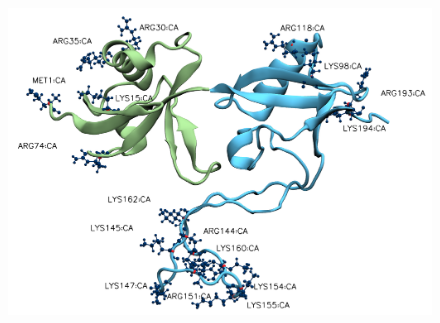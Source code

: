 \documentclass[
  twocolumn]{biophys-new-mod}
\begin{document}
\begin{figure}

\begin{minipage}[t]{\linewidth}

{\centering 


}

\subcaption{\label{fig-f0f1-ri-npip}~}
\end{minipage}%
\newline
\begin{minipage}[t]{\linewidth}

{\centering 

\includegraphics{./assets/vmd/f0f1/residues.png}

}
\end{minipage}
\end{figure}
\end{document}
